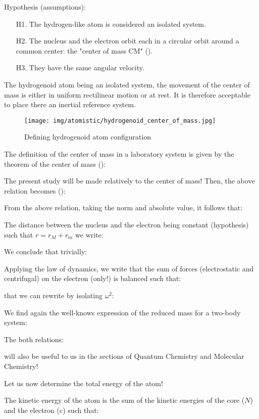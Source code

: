 	Hypothesis (assumptions):
	\begin{enumerate}
		\item[H1.] The hydrogen-like atom is considered an isolated system.
	
		\item[H2.] The nucleus and the electron orbit each in a circular orbit around a common center: the "center of mass CM" ().

		\item[H3.] They have the same angular velocity.
		\end{enumerate}
	The hydrogenoid atom being an isolated system, the movement of the center of mass is either in uniform rectilinear motion or at rest. It is therefore acceptable to place there an inertial reference system.
	\begin{figure}[H]
		\centering
		\texttt{[image: img/atomistic/hydrogenoid\_center\_of\_mass.jpg]}
		\caption{Defining hydrogenoid atom configuration}
	\end{figure}
	The definition of the center of mass in a laboratory system is given by the theorem of the center of mass ():
	
The present study will be made relatively to the center of mass! Then, the above relation becomes ():
	
From the above relation, taking the norm and absolute value, it follows that:
	
The distance between the nucleus and the electron being constant (hypothesis) such that $r=r_M+r_m$ we write:
	
We conclude that trivially:
	
	Applying the law of dynamics, we write that the sum of forces (electrostatic and centrifugal) on the electron (only!) is balanced such that:
	
that we can rewrite by isolating $\omega^2$:
	
	We find again the well-knows expression of the reduced mass for a two-body system:
	
	The both relations:
	
	will also be useful to us in the sections of Quantum Chemistry and Molecular Chemistry!
	
	Let us now determine the total energy of the atom!

	The kinetic energy of the atom is the sum of the kinetic energies of the core ($N$) and the electron ($e$) such that:
	
